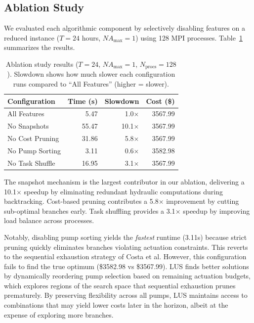 \documentclass[final,3p,twocolumn]{elsarticle}
\begin{document}
\subsection{Ablation Study}

We evaluated each algorithmic component by selectively disabling features on a reduced instance ($T=24$ hours, $NA_{\max}=1$) using 128 MPI processes. Table~\ref{tab:ablation} summarizes the results.

\begin{table}[htbp]
	\centering
	\caption{Ablation study results ($T=24$, $NA_{\max}=1$, $N_{\text{procs}}=128$). Slowdown shows how much slower each configuration runs compared to ``All Features'' (higher = slower).}
	\label{tab:ablation}
	\small
	\begin{tabular}{@{}lrrr@{}}
		\hline
		Configuration   & Time (s) & Slowdown     & Cost (\$) \\
		\hline
		All Features    & 5.47     & 1.0$\times$  & 3567.99   \\
		No Snapshots    & 55.47    & 10.1$\times$ & 3567.99   \\
		No Cost Pruning & 31.86    & 5.8$\times$  & 3567.99   \\
		No Pump Sorting & 3.11     & 0.6$\times$  & 3582.98   \\
		No Task Shuffle & 16.95    & 3.1$\times$  & 3567.99   \\
		\hline
	\end{tabular}
\end{table}

The snapshot mechanism is the largest contributor in our ablation, delivering a 10.1$\times$ speedup by eliminating redundant hydraulic computations during backtracking. Cost-based pruning contributes a 5.8$\times$ improvement by cutting sub-optimal branches early. Task shuffling provides a 3.1$\times$ speedup by improving load balance across processes.

Notably, disabling pump sorting yields the \emph{fastest} runtime (3.11s) because strict pruning quickly eliminates branches violating actuation constraints. This reverts to the sequential exhaustion strategy of Costa et al. However, this configuration fails to find the true optimum (\$3582.98 vs \$3567.99). LUS finds better solutions by dynamically reordering pump selection based on remaining actuation budgets, which explores regions of the search space that sequential exhaustion prunes prematurely. By preserving flexibility across all pumps, LUS maintains access to combinations that may yield lower costs later in the horizon, albeit at the expense of exploring more branches.
\end{document}
